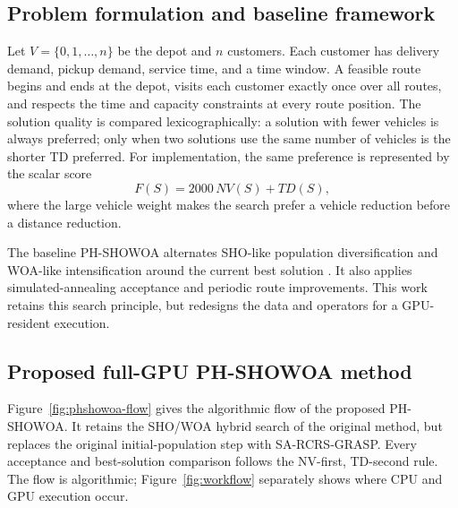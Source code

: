 \documentclass[pdflatex,sn-mathphys-num]{sn-jnl}
\begin{document}
\subsection{Problem formulation and baseline framework}\label{sec:problem}

Let $V=\{0,1,\ldots,n\}$ be the depot and $n$ customers. Each customer has delivery demand, pickup demand, service time, and a time window. A feasible route begins and ends at the depot, visits each customer exactly once over all routes, and respects the time and capacity constraints at every route position. The solution quality is compared lexicographically: a solution with fewer vehicles is always preferred; only when two solutions use the same number of vehicles is the shorter TD preferred. For implementation, the same preference is represented by the scalar score
\begin{equation}
 F(S)=2000\,NV(S)+TD(S),
\label{eq:fitness}
\end{equation}
where the large vehicle weight makes the search prefer a vehicle reduction before a distance reduction.

The baseline PH-SHOWOA alternates SHO-like population diversification and WOA-like intensification around the current best solution \cite{nguyen2026phshowoa}. It also applies simulated-annealing acceptance and periodic route improvements. This work retains this search principle, but redesigns the data and operators for a GPU-resident execution.

\subsection{Proposed full-GPU PH-SHOWOA method}\label{sec:method}

Figure~\ref{fig:phshowoa-flow} gives the algorithmic flow of the proposed PH-SHOWOA. It retains the SHO/WOA hybrid search of the original method, but replaces the original initial-population step with SA-RCRS-GRASP. Every acceptance and best-solution comparison follows the NV-first, TD-second rule. The flow is algorithmic; Figure~\ref{fig:workflow} separately shows where CPU and GPU execution occur.
\end{document}
